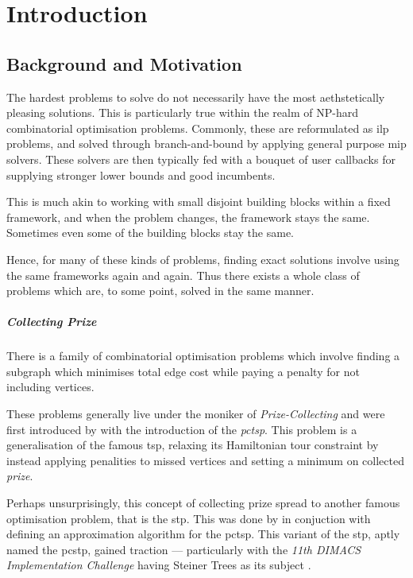 \chapter{Introduction}
\section{Background and Motivation}\label{sec:intro:background}
The hardest problems to solve do not necessarily have the most aethstetically pleasing solutions.
This is particularly true within the realm of NP-hard combinatorial optimisation problems.
Commonly, these are reformulated as \gls{ilp} problems, and solved through
branch-and-bound
by applying general purpose
\gls{mip} solvers. These solvers are then typically
fed with a bouquet of user callbacks for supplying
stronger lower bounds and good incumbents.

This is much akin to working with small disjoint building blocks
within a fixed framework, and when the problem changes, the framework stays
the same. Sometimes even some of the building blocks stay the same.

Hence, for many of these kinds of problems, finding exact solutions
involve using the same frameworks again and again.
Thus there exists a whole class of problems which are, to some point,
solved in the same manner.

\paragraph{Collecting Prize}
There is a family of combinatorial optimisation problems which involve
finding a subgraph which minimises total edge cost while paying a penalty
for not including vertices.

These problems generally live under the moniker of \textit{Prize-Collecting}
and were first introduced by \citet*{balas1989prize}
with the introduction of the \textit{\gls{pctsp}}. This problem is a generalisation of
the famous \gls{tsp}, relaxing its Hamiltonian tour constraint by instead applying penalities
to missed vertices and setting a minimum on collected \textit{prize}.

Perhaps unsurprisingly, this concept of collecting prize spread to another famous optimisation
problem, that is the \gls{stp}. This was done by \citet{Bienstock1993} in conjuction with
defining an approximation algorithm for the \gls{pctsp}. This variant of the \gls{stp},
aptly named the \gls{pcstp}, gained traction --- particularly with the
\textit{11th DIMACS Implementation Challenge} having Steiner Trees as its subject
\citep{DIMACS}.


